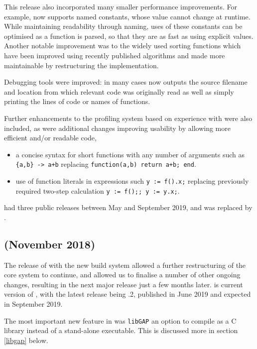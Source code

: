 \documentclass{deliverablereport}
\begin{document}
This release also incorporated many smaller performance improvements. For example,
\GAP now supports named constants, whose value cannot change 
at runtime. While maintaining readability through naming, uses of
these constants can be optimised as a function is parsed, so that they
are as fast as using explicit values. Another notable improvement was
to the widely used  sorting functions which have been improved using
recently published algorithms and made more maintainable by
restructuring the implementation.

Debugging  tools were improved: in many cases \GAP now outputs the
source filename  and location from which relevant code was originally
read as well as simply printing the lines of code or names of functions.

Further enhancements to the profiling system based on experience with
 were also included, as were additional changes improving \GAP
usability by allowing more
efficient and/or readable code,
\begin{itemize}
  \item a concise syntax for short
functions with any number of arguments such as \verb|{a,b} -> a+b| replacing \verb|function(a,b) return a+b; end|. 
\item use of function literals in expressions such \verb|y := f().x;|
replacing previously required two-step calculation \verb|y := f();; y := y.x;|.
\end{itemize}

 had three public releases between May and September 2019, and
was replaced by .

\subsection{ (November 2018)}\label{gap-4.10}

The release of  with the new build system allowed a
further restructuring of the core \GAP system to continue, and allowed
us to finalise a number of other ongoing changes, 
 resulting in the 
next major release just a few months later.  is current version
of \GAP, with the latest release being .2, published in June
2019 and  expected in September 2019.

The most important new feature in  was \texttt{libGAP} an
option to compile \GAP as a C library instead of a stand-alone
executable. This is discussed more in section \ref{libgap} below.
\end{document}
